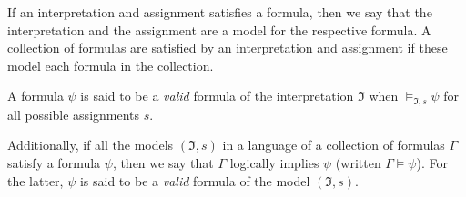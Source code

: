 \begin{definition}
  If an interpretation and assignment satisfies a formula, then we say that the interpretation and the assignment are a model for the respective formula. A collection of formulas are satisfied by an interpretation and assignment if these model each formula in the collection.

  A formula $\psi$ is said to be a \emph{valid} 
  formula of the interpretation $\mathfrak{I}$ 
  when $\models_{\mathfrak{I}, s} \psi$ for all 
  possible assignments $s$.

  Additionally, if all the models $(\mathfrak{I},
  s)$ in a language of a collection of formulas 
  $\Gamma$ satisfy a formula $\psi$, then we say 
  that $\Gamma$ logically implies $\psi$ 
  (written $\Gamma \models \psi$). For the 
  latter, $\psi$ is said to be a \emph{valid} 
  formula of the model $(\mathfrak{I}, s)$.

\end{definition}

